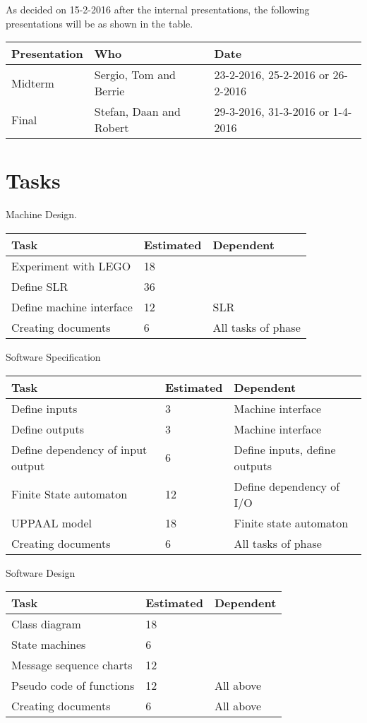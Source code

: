 \documentclass[a4paper,oneside,11pt]{article}
\begin{document}
As decided on 15-2-2016 after the internal presentations, the following presentations will be as shown in the table.\\
\begin{center}
\begin{tabular}{|l|l|l|}
\hline
Presentation & Who & Date\\
\hline
Midterm & Sergio, Tom and Berrie & 23-2-2016, 25-2-2016 or 26-2-2016\\
\hline
Final & Stefan, Daan and Robert & 29-3-2016, 31-3-2016 or 1-4-2016\\
\hline
\end{tabular}
\end{center}

\section{Tasks}
Machine Design.\\
\begin{center}
\begin{tabular}{|l|l|l|}
\hline
Task & Estimated & Dependent\\
\hline
Experiment with LEGO & 18 & \\
\hline
Define SLR & 36 & \\
\hline
Define machine interface & 12 & SLR\\
\hline
Creating documents & 6 & All tasks of phase\\
\hline
\end{tabular}
\end{center}
Software Specification
\begin{center}
\begin{tabular}{|l|l|l|}
\hline
Task & Estimated & Dependent\\
\hline
Define inputs & 3 & Machine interface\\
\hline
Define outputs & 3 & Machine interface\\
\hline
Define dependency of input output & 6 & Define inputs, define outputs\\
\hline
Finite State automaton & 12 & Define dependency of I/O\\
\hline
UPPAAL model & 18 &  Finite state automaton\\
\hline
Creating documents & 6 & All tasks of phase\\
\hline
\end{tabular}
\end{center}
Software Design
\begin{center}
\begin{tabular}{|l|l|l|}
\hline
Task & Estimated & Dependent\\
\hline
Class diagram & 18 & \\ \hline
State machines & 6 & \\ \hline
Message sequence charts & 12 & \\ \hline
Pseudo code of functions & 12 & All above\\ \hline
Creating documents & 6 & All above\\
\hline
\end{tabular}
\end{center}
\end{document}
